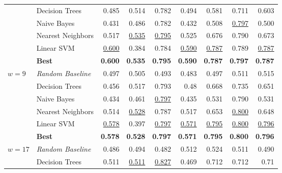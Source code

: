 \documentclass[runningheads]{llncs}
\begin{document}
\begin{table*}[t]
\begin{tabular}{l@{\hskip 0.1in}l@{\hskip 0.1in}r@{\hskip 0.1in}r@{\hskip 0.1in}r@{\hskip 0.1in}r@{\hskip 0.1in}r@{\hskip 0.1in}r@{\hskip 0.1in}r}
		& Decision Trees           & 0.485          & 0.514          & 0.782          & 0.494          & 0.581          & 0.711          & 0.603          \\
		& Naive Bayes              & 0.431          & 0.486          & 0.782          & 0.432          & 0.508          & \underline{0.797}    & 0.500            \\
		& Nearest Neighbors        & 0.517          & \underline{0.535}    & \underline{0.795}    & 0.525          & 0.676          & 0.790           & 0.673          \\
		& Linear SVM               & \underline{0.600}      & 0.384          & 0.784          & \underline{0.590}     & \underline{0.787}    & 0.789          & \underline{0.787}    \\    \midrule
		& \textbf{Best}          & \textbf{0.600}   & \textbf{0.535} & \textbf{0.795} & \textbf{0.590}  & \textbf{0.787} & \textbf{0.797} & \textbf{0.787} \\    \midrule
	$w=9$	& \textit{Random Baseline} & 0.497          & 0.505          & 0.493          & 0.483          & 0.497          & 0.511          & 0.515          \\
		& Decision Trees           & 0.456          & 0.517          & 0.793          & 0.48           & 0.668          & 0.735          & 0.651          \\
		& Naive Bayes              & 0.434          & 0.461          & \underline{0.797}    & 0.435          & 0.531          & 0.790           & 0.531          \\
		& Nearest Neighbors        & 0.514          & \underline{0.528}    & 0.787          & 0.517          & 0.653          & \underline{0.800}      & 0.648          \\
		& Linear SVM   				& \underline{0.578}    & 0.397          & \underline{0.797}    & \underline{0.571}    & \underline{0.795}    & \underline{0.800}      & \underline{0.796}    \\     \midrule
		& \textbf{Best}          & \textbf{0.578} & \textbf{0.528} & \textbf{0.797} & \textbf{0.571} & \textbf{0.795} & \textbf{0.800}   & \textbf{0.796} \\    \midrule
	$w=17$	& \textit{Random Baseline} & 0.486          & 0.494          & 0.482          & 0.512          & 0.524          & 0.511          & 0.490           \\
		& Decision Trees           & 0.511          & \underline{0.511}    & \underline{0.827}    & 0.469          & 0.712          & 0.712          & 0.71           \\

\end{tabular}
\end{table*}
\end{document}
